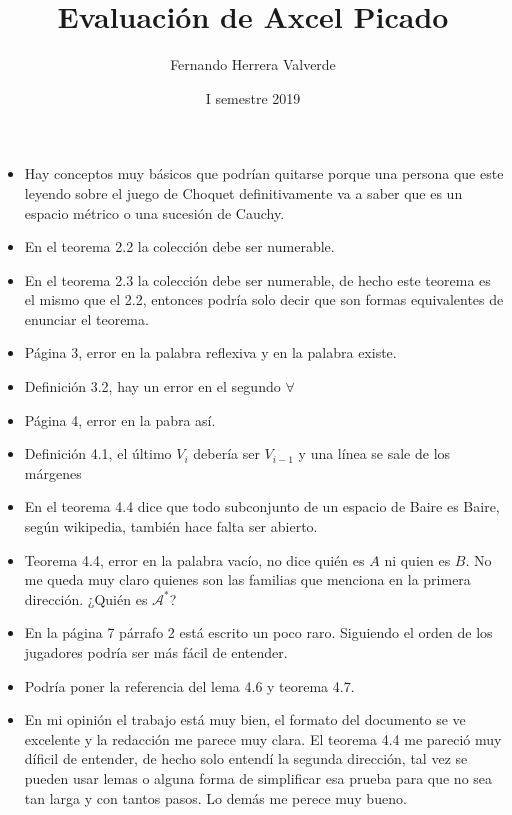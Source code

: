 \documentclass[11pt]{article}
\title{Evaluación de Axcel Picado}
\author{Fernando Herrera Valverde}
\date{I semestre 2019}
\begin{document}
\maketitle

\begin{itemize}
\item Hay conceptos muy básicos que podrían quitarse porque una persona que este leyendo sobre el juego de Choquet definitivamente va a saber que 
es un espacio métrico o una sucesión de Cauchy.
\item En el teorema 2.2 la colección debe ser numerable.
\item En el teorema 2.3 la colección debe ser numerable, de hecho este teorema es el mismo que el 2.2, entonces podría solo decir que son formas equivalentes de enunciar el teorema.
\item Página 3, error en la palabra reflexiva y en la palabra existe.
\item Definición 3.2, hay un error en el segundo $\forall$
\item Página 4, error en la pabra así.
\item Definición 4.1, el último $V_i$ debería ser $V_{i-1}$ y una línea se sale de los márgenes
\item En el teorema 4.4 dice que todo subconjunto de un espacio de Baire es Baire, según wikipedia, también hace falta ser abierto.
\item Teorema 4.4, error en la palabra vacío, no dice quién es $A$ ni quien es $B$. No me queda muy claro quienes son las familias que menciona en la primera dirección. ¿Quién es $\mathcal{A}^*$?
\item En la página 7 párrafo 2 está escrito un poco raro. Siguiendo el orden de los jugadores podría ser más fácil de entender.
\item Podría poner la referencia del lema 4.6 y teorema 4.7.
\item En mi opinión el trabajo está muy bien, el formato del documento se ve excelente y la redacción me parece muy clara. El teorema 4.4 me pareció muy díficil de entender, de hecho solo entendí la segunda dirección, tal vez se pueden usar lemas o alguna forma de simplificar esa prueba para que no sea tan larga y con tantos pasos. Lo demás me perece muy bueno.
\end{itemize}
\end{document}
